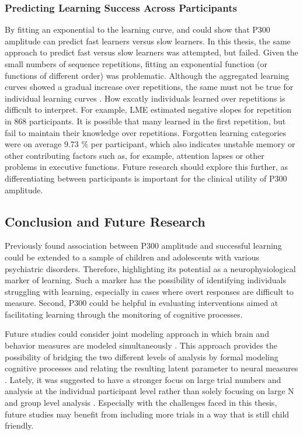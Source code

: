 \subsubsection{Predicting Learning Success Across Participants}
By fitting an exponential to the learning curve, \textcite{steinemannTrackingNeuralCorrelates2016} and \textcite{strzelczykNeurophysiologicalMarkersSuccessful2022} could show that P300 amplitude can predict fast learners versus slow learners. In this thesis, the same approach to predict fast versus slow learners was attempted, but failed. Given the small numbers of sequence repetitions, fitting an exponential function (or functions of different order) was problematic.
Although the aggregated learning curves showed a gradual increase over repetitions, the same must not be true for individual learning curves \parencite{estesProblemInferenceCurves1956,smithSmallBeautifulDefense2018}. How 
excatly individuals learned over repetitions is difficult to interpret. For example, LME estimated negative slopes for repetition in 868 participants. It is possible that many learned in the first repetition, but fail to maintain their knowledge over repetitions. Forgotten learning categories were on average 9.73 \% per participant, which also indicates unstable memory or other contributing factors such as, for example, attention lapses or other problems in executive functions. 
Future research should explore this further, as differentiating between participants is important for the clinical utility of P300 amplitude. 


\subsection{Conclusion and Future Research}
Previously found association between P300 amplitude and successful learning could be extended to a sample of children and adolescents with various psychiatric disorders. Therefore, highlighting its potential as a neurophysiological marker of learning. Such a marker has the possibility of identifying individuals struggling with learning, especially in cases where overt responses are difficult to measure. Second, P300 could be helpful in evaluating interventions aimed at facilitating learning through the monitoring of cognitive processes.  

Future studies could consider joint modeling approach in which brain and behavior measures are modeled simultaneously \parencite{turnerConstrainingCognitiveAbstractions2015}. This approach provides the possibility of bridging the two different levels of analysis by formal modeling cognitive processes and relating the resulting latent parameter to neural measures \parencite{turnerApproachesAnalysisModelbased2017a}. Lately, it was suggested to have a stronger focus on large trial numbers and analysis at the individual participant level rather than solely focusing on large N and group level analysis \parencite{smithSmallBeautifulDefense2018}. Especially with the challenges faced in this thesis, future studies may benefit from including more trials in a way that is still child friendly. 



